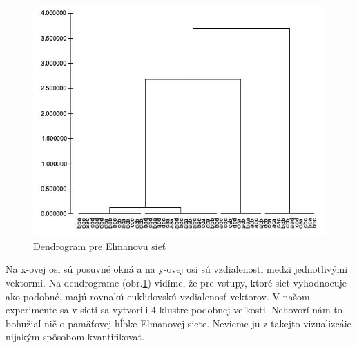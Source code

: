 \begin{figure}[H]
    \centering
    \includegraphics[width=\textwidth]{assets/dendrogram}
    \caption{Dendrogram pre Elmanovu sieť}
    \label{dendrogram}
\end{figure}
Na x-ovej osi sú posuvné okná a na y-ovej osi sú vzdialenosti medzi jednotlivými vektormi.
Na dendrograme (obr.\ref{dendrogram}) vidíme, že pre vstupy, ktoré sieť vyhodnocuje ako podobné, majú rovnakú euklidovskú vzdialenosť vektorov.
V našom experimente sa v sieti sa vytvorili 4 klustre podobnej veľkosti. Nehovorí nám to bohužiaľ nič o pamäťovej hĺbke Elmanovej siete.
Nevieme ju z takejto vizualizcáie nijakým spôsobom kvantifikovať.

